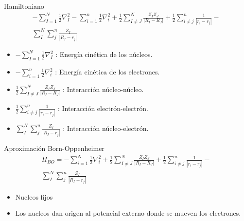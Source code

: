 \begin{frame}{Hamiltoniano}
    \begin{eqnarray}
    -\sum _{I=1}^{N} \frac{1}{2} \nabla _{I}^{2} - \sum 
    _{i=1}^{n} \frac{1}{2} \nabla _{i}^{2} + \frac{1}{2} \sum _{I \ne 
        J}^{N} \frac{Z_{I}Z_{J}}{|R_{I}-R_{J}|} + \frac{1}{2} \sum _{i\ne 
        j}^{n} \frac{1}{|r_{i}-r_{j}|} - \nonumber \\ 
     \sum _{I}^{N} \sum _{j}^{n} \frac{Z_{I}}{|R_{I}-r_{j}|} \nonumber
    \end{eqnarray}
    
\begin{itemize}
    \item $-\sum _{I=1}^{N} \frac{1}{2} \nabla _{I}^{2}$ : 
    Energ\'ia cin\'etica de los n\'ucleos.
    \item $- \sum _{i=1}^{n} \frac{1}{2} \nabla _{i}^{2}$ : 
    Energ\'ia cin\'etica de los electrones.
    \item $\frac{1}{2} \sum _{I \ne J}^{N} 
    \frac{Z_{I}Z_{J}}{|R_{I}-R_{J}|}$ : 
    Interacci\'on n\'ucleo-n\'ucleo.
    \item $\frac{1}{2} \sum _{i\ne j}^{n} 
    \frac{1}{|r_{i}-r_{j}|}$ : 
    Interacci\'on electr\'on-electr\'on.
    \item $\sum _{I}^{N} \sum _{j}^{n} 
    \frac{Z_{I}}{|R_{I}-r_{j}|}$ : 
    Interacci\'on n\'ucleo-electr\'on.
\end{itemize}

\end{frame}

\begin{frame}{Aproximaci\'on Born-Oppenheimer}
    \begin{eqnarray}
    H_{BO} =-\sum _{i=1}^{N} \frac{1}{2} \nabla _{i}^{2} + \frac{1}{2} \sum _{I 
    \ne 
        J}^{N} \frac{Z_{I}Z_{J}}{|R_{I}-R_{J}|} + \frac{1}{2} \sum _{i\ne 
        j}^{n} 
    \frac{1}{|r_{i}-r_{j}|} - \nonumber \\ \sum _{I}^{N} \sum _{j}^{n} 
    \frac{Z_{I}}{|R_{I}-r_{j}|} \nonumber
    \end{eqnarray}
\begin{itemize}
    \item Nucleos fijos
    \item Los nucleos dan origen al potencial externo donde se mueven los 
    electrones.
\end{itemize}
\end{frame}